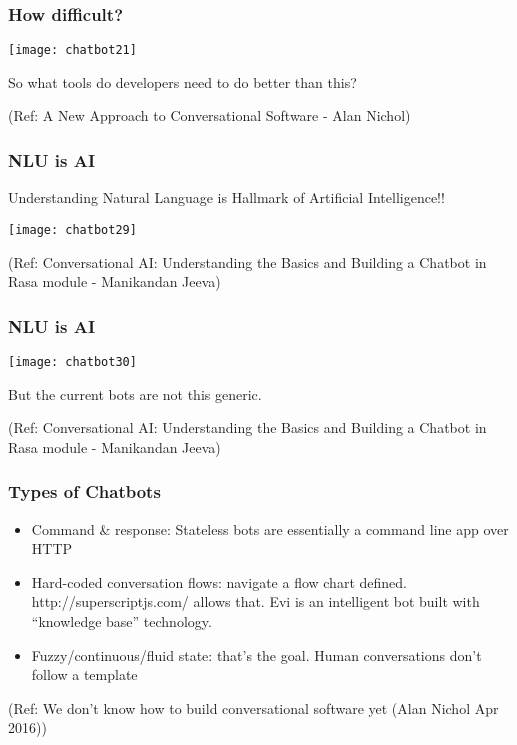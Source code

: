  \begin{frame}[fragile]\frametitle{How difficult?}

\begin{center}
\texttt{[image: chatbot21]}

\end{center}

So what tools do developers need to do better than this?


{\tiny (Ref: A New Approach to Conversational Software - Alan Nichol)}
\end{frame}

\begin{frame}[fragile]\frametitle{NLU is AI}

Understanding Natural Language is Hallmark of Artificial Intelligence!!

\begin{center}
\texttt{[image: chatbot29]}
\end{center}

{\tiny (Ref: Conversational AI: Understanding the Basics and Building a Chatbot in Rasa module - Manikandan Jeeva)}
\end{frame}

\begin{frame}[fragile]\frametitle{NLU is AI}

\begin{center}
\texttt{[image: chatbot30]}
\end{center}

But the current bots are not this generic.

{\tiny (Ref: Conversational AI: Understanding the Basics and Building a Chatbot in Rasa module - Manikandan Jeeva)}
\end{frame}


\begin{frame}[fragile]\frametitle{Types of Chatbots}
\begin{itemize}
\item Command \& response: Stateless bots are essentially a command line app over HTTP
\item Hard-coded conversation flows: navigate a flow chart defined. http://superscriptjs.com/ allows that. Evi is an intelligent bot built with “knowledge base” technology.
\item Fuzzy/continuous/fluid state: that’s the goal. Human conversations don’t follow a template
\end{itemize}

{\tiny (Ref: We don’t know how to build conversational software yet (Alan Nichol Apr 2016))}
\end{frame}

